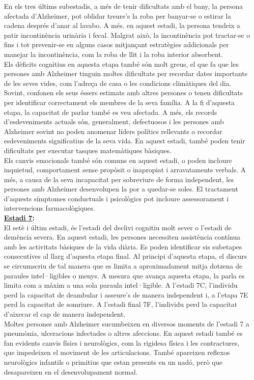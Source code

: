 \documentclass[a4paper,12pt]{report}
\begin{document}
En els tres últims subestadis, a més de tenir dificultats amb el bany, la persona afectada d'Alzheimer, pot oblidar treure's la roba per banyar-se o estirar la cadena després d'anar al lavabo. A més, en aquest estadi, la persona tendeix a patir incontinència urinària i fecal. Malgrat això, la incontinència pot tractar-se o fins i tot prevenir-se en alguns casos mitjançant estratègies addicionals per manejar la incontinència, com la roba de llit i la roba interior absorbent.\\
Els dèficits cognitius en aquesta etapa també són molt greus, el que fa que les persones amb Alzheimer tinguin moltes dificultats per recordar dates importants de les seves vides, com l'adreça de casa o les condicions climàtiques del dia. Sovint, confonen els seus éssers estimats amb altres persones o tenen dificultats per identificar correctament els membres de la seva família. A la fi d'aquesta etapa, la capacitat de parlar també es veu afectada. A més, els records d'esdeveniments actuals són, generalment, defectuosos i les persones amb Alzheimer sovint no poden anomenar líders polítics rellevants o recordar esdeveniments significatius de la seva vida. En aquest estadi, també poden tenir dificultats per executar tasques matemàtiques bàsiques.\\
Els canvis emocionals també són comuns en aquest estadi, o  poden incloure inquietud, comportament sense propòsit o inapropiat i  arravataments verbals. A més, a causa de la seva incapacitat per sobreviure de forma independent, les persones amb Alzheimer desenvolupen la por a quedar-se soles. El tractament d'aquests símptomes conductuals i psicològics pot incloure assessorament i intervencions farmacològiques.\\
\textbf{\underline{Estadi 7}:}\\
El setè i últim estadi, és l'estadi del declivi cognitiu molt sever o l'estadi de demència severa. En aquest estadi, les persones necessiten assistència contínua amb les activitats bàsiques de la vida diària. Es poden identificar sis subetapes consecutives al llarg d'aquesta etapa final. Al principi d'aquesta etapa, el discurs se circumscriu de tal manera que es limita a aproximadament mitja dotzena de paraules intel·ligibles o menys. A mesura que avança aquesta etapa, la parla es limita com a màxim a una sola paraula intel·ligible. A l'estadi 7C, l'individu perd la capacitat de deambular i asseure's de manera independent i, a l'etapa 7E perd la capacitat de somriure. A l'estadi final 7F, l'individu perd la capacitat d'aixecar el cap de manera independent.\\
Moltes persones amb Alzheimer sucumbeixen en diversos moments de l'estadi 7 a pneumònia, ulceracions infectades o altres afeccions. En aquest estadi també es fan evidents canvis físics i neurològics, com la rigidesa física i les contractures, que impedeixen el moviment de les articulacions. També apareixen reflexos neurològics infantils o primitius que estan presents en un nadó, però que desapareixen en el desenvolupament normal.
\end{document}
